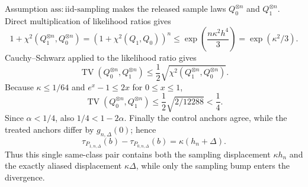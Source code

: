 Assumption \(\mathrm{ass:iid\text{-}sampling}\) makes the released sample laws \(Q_0^{\otimes n}\) and \(Q_1^{\otimes n}\).  Direct multiplication of likelihood ratios gives
\[
 1+\chi^2(Q_1^{\otimes n},Q_0^{\otimes n})
 =(1+\chi^2(Q_1,Q_0))^n
 \le\exp\!\left(\frac{n\kappa^2h^4}{3}\right)
 =\exp(\kappa^2/3).
\]
Cauchy--Schwarz applied to the likelihood ratio gives
\[
 \operatorname{TV}(Q_0^{\otimes n},Q_1^{\otimes n})
 \le\frac12\sqrt{\chi^2(Q_1^{\otimes n},Q_0^{\otimes n})}.
\]
Because \(\kappa\le1/64\) and \(e^x-1\le2x\) for \(0\le x\le1\),
\[
 \operatorname{TV}(Q_0^{\otimes n},Q_1^{\otimes n})
 \le\frac12\sqrt{2/12288}<\frac14.
\]
Since \(\alpha<1/4\), also \(1/4<1-2\alpha\).  Finally the control anchors agree, while the treated anchors differ by \(g_{n,\Delta}(0)\); hence
\[
 \tau_{P_{1,n,\Delta}}(b)-\tau_{P_{0,n,\Delta}}(b)
 =\kappa(h_n+\Delta).
\]
Thus this single same-class pair contains both the sampling displacement \(\kappa h_n\) and the exactly aliased displacement \(\kappa\Delta\), while only the sampling bump enters the divergence.